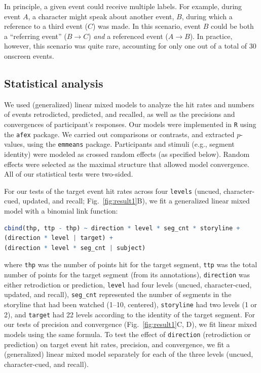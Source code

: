 \documentclass[10pt]{article}
\begin{document}
In principle, a given event could receive multiple labels.  For example, during event $A$, a character might speak about another event, $B$, during which a reference to a third event ($C$) was made.  In this scenario, event $B$ could be both a ``referring event'' ($B \rightarrow C$) \textit{and} a referenced event ($A \rightarrow B$).  In practice, however, this scenario was quite rare, accounting for only one out of a total of 30 onscreen events.

\subsection*{Statistical analysis}
We used (generalized) linear mixed models to analyze the hit rates and numbers of events retrodicted, predicted, and recalled, as well as the precisions and convergences of participant's responses.  Our models were implemented in \texttt{R} using the \texttt{afex} package.  We carried out comparisons or contrasts, and extracted $p$-values, using the \texttt{emmeans} package.  Participants and stimuli (e.g., segment identity) were modeled as crossed random effects (as specified below).  Random effects were selected as the maximal structure that allowed model convergence. All of our statistical tests were two-sided.

For our tests of the target event hit rates across four \texttt{levels} (uncued, character-cued, updated, and recall; Fig.~\ref{fig:result1}B), we fit a generalized linear mixed model with a binomial link function:
\begin{lstlisting}[language=R]
  cbind(thp, ttp - thp) ~ direction * level * seg_cnt * storyline +
(direction * level | target) +
(direction * level * seg_cnt | subject)
\end{lstlisting}
where \texttt{thp} was the number of points hit for the target segment, \texttt{ttp} was the total number of points for the target segment (from its annotations), \texttt{direction} was either retrodiction or prediction, \texttt{level} had four levels (uncued, character-cued, updated, and recall), \texttt{seg\_cnt} represented the number of segments in the storyline that had been watched (1--10, centered),  \texttt{storyline} had two levels (1 or 2), and \texttt{target} had 22 levels according to the identity of the target segment.  For our tests of precision and convergence (Fig.~\ref{fig:result1}C, D), we fit linear mixed models using the same formula.  To test the effect of \texttt{direction} (retrodiction or prediction) on target event hit rates, precision, and convergence, we fit a (generalized) linear mixed model separately for each of the three levels (uncued, character-cued, and recall).  
\end{document}
